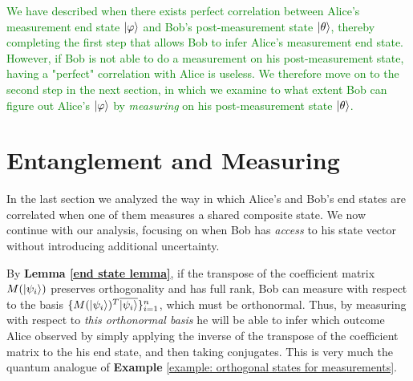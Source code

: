 \textcolor{green}{We have described when there exists perfect correlation between Alice's measurement end state $\ket{\varphi}$ and Bob's post-measurement state $\ket{\theta}$, thereby completing the first step that allows Bob to infer Alice's measurement end state. However, if Bob is not able to do a measurement on his post-measurement state, having a "perfect" correlation with Alice is useless. We therefore move on to the second step in the next section, in which we examine to what extent Bob can figure out Alice's $\ket{\varphi}$ by \emph{measuring} on his post-measurement state $\ket{\theta}$.}


\pagebreak

\section{Entanglement and Measuring}
In the last section we analyzed the way in which Alice's and Bob's end states are correlated when one of them measures a shared composite state. We now continue with our analysis, focusing on when Bob has {\emph{access}} to his state vector without introducing additional uncertainty. 

By \textbf{Lemma \ref{end state lemma}}, if the transpose of the coefficient matrix $M(\ket{\psi_i})$ preserves orthogonality and has full rank, Bob can measure with respect to the basis $\{M(\ket{\psi_i})^T \overline{\ket{\psi_i}}\}_{i=1}^n$, which must be orthonormal. Thus, by measuring with respect to {\emph{this orthonormal basis}} he will be able to infer which outcome Alice observed by simply applying the inverse of the transpose of the coefficient matrix to the his end state, and then taking conjugates. This is very much the quantum analogue of {\bf{Example}} \ref{example: orthogonal states for measurements}.

